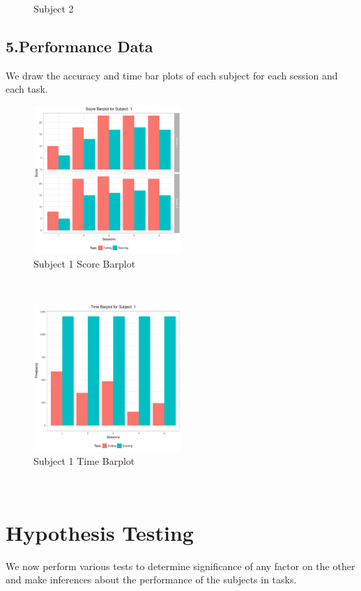 \documentclass[12pt,epsf]{report}
\begin{document}
{\begin{figure}[!htb]
\begin{minipage}[c]{0.5\linewidth}
	\caption{Subject 2}
	\end{minipage}
\end{figure}
\FloatBarrier
\subsection*{5.Performance Data}
We draw the accuracy and time bar plots of each subject for each session and each task.\\
\begin{figure}[!htb]
	\centering
	\includegraphics[width=0.5\textwidth]{1_Score_barplot.pdf}
	\caption{Subject 1 Score Barplot}
	\centering
\end{figure}
\\
\begin{figure}[!htb]
	\centering
	\includegraphics[width=0.5\textwidth]{1_Time_barplot.pdf}
	\caption{Subject 1 Time Barplot}
	\centering
\end{figure}\\
\section*{Hypothesis Testing}
We now perform various tests to determine significance of any factor on the other and make inferences about the performance of the subjects in tasks.\\
}
\end{document}
